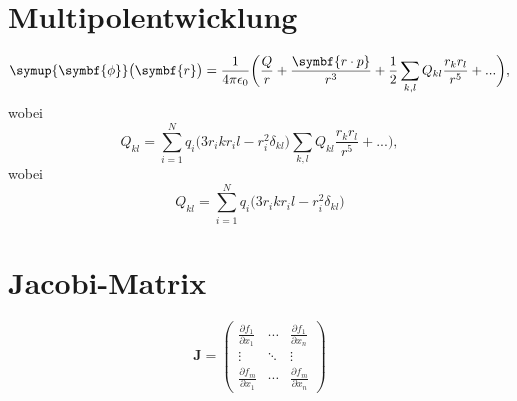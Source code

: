 \documentclass{scrartcl}
\newcommand{\be}{\begin{equation}} %
\newcommand{\ee}{\end{equation}} %
\begin{document}
\section{Multipolentwicklung}
\be
\symup{\symbf{\phi}}\bigl(\symbf{r}\bigr)=\frac{1}{4\pi\epsilon_0}
\biggl(\frac{Q}{r}+\frac{\symbf{r\cdot p}}{r^3}+\frac{1}{2}
\sum_{k,l}Q_{kl}\frac{r_k r_l}{r^5}+...\biggr) \label{eqn:19},
\ee
wobei
\begin{equation*} %
  Q_{k l}=
  \sum_{i=1}^N %
  q_i\bigl(3r_i k r_i l -r^2_i \delta_{kl} \bigr)
\sum_{k,l}Q_{k l} \frac{r_k r_l}{r^5}+...\biggr) \label{eqn:19},
\end{equation*}
wobei
\begin{equation*} %
  Q_{k l}=
  \sum_{i=1}^N %
   q_i \bigl(3r_ik r_il -r^2_i \delta_{kl} \bigr)%
\end{equation*}
\section{Jacobi-Matrix}
\begin{equation}
  \symbf{J}=
  \begin{pmatrix}
    \frac{\partial f_1}{\partial x_1} & \cdots & \frac{\partial f_1}{\partial x_n}
    \\ %
    \vdots & %
    \ddots & %
    \vdots \\
    \frac{\partial f_m}{\partial x_1} & \cdots %
    & \frac{\partial f_m}{\partial x_n}
  \end{pmatrix}
\end{equation}
\end{document}
